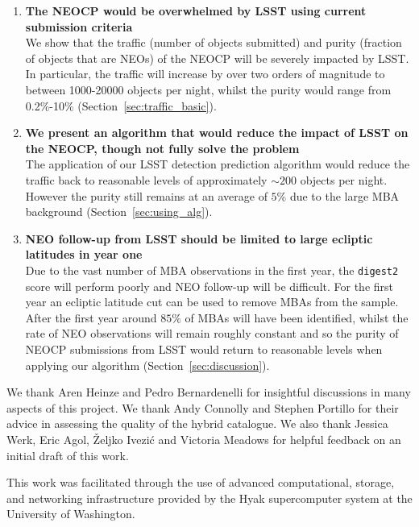 \documentclass[twocolumn]{aastex631}
\newcommand{\dig}{\texttt{digest2}}
\newcommand{\npernightAlg}{200}
\newcommand{\purityAlg}{5}
\begin{document}
\begin{enumerate}
    \item \textbf{The NEOCP would be overwhelmed by LSST using current submission criteria}\\We show that the traffic (number of objects submitted) and purity (fraction of objects that are NEOs) of the NEOCP will be severely impacted by LSST. In particular, the traffic will increase by over two orders of magnitude to between 1000-20000 objects per night, whilst the purity would range from 0.2\%-10\% (Section~\ref{sec:traffic_basic}).
    \item \textbf{We present an algorithm that would reduce the impact of LSST on the NEOCP, though not fully solve the problem}\\The application of our LSST detection prediction algorithm would reduce the traffic back to reasonable levels of approximately ${\sim}\npernightAlg{}$ objects per night. However the purity still remains at an average of $\purityAlg{}\%$ due to the large MBA background (Section~\ref{sec:using_alg}).
    \item \textbf{NEO follow-up from LSST should be limited to large ecliptic latitudes in year one}\\Due to the vast number of MBA observations in the first year, the \dig{} score will perform poorly and NEO follow-up will be difficult. For the first year an ecliptic latitude cut can be used to remove MBAs from the sample. After the first year around $85\%$ of MBAs will have been identified, whilst the rate of NEO observations will remain roughly constant and so the purity of NEOCP submissions from LSST would return to reasonable levels when applying our algorithm (Section~\ref{sec:discussion}).
\end{enumerate}

\begin{acknowledgements}
    We thank Aren Heinze and Pedro Bernardenelli for insightful discussions in many aspects of this project. We thank Andy Connolly and Stephen Portillo for their advice in assessing the quality of the hybrid catalogue. We also thank Jessica Werk, Eric Agol, Željko Ivezić and Victoria Meadows for helpful feedback on an initial draft of this work.
    
    This work was facilitated through the use of advanced computational, storage, and networking infrastructure provided by the Hyak supercomputer system at the University of Washington.
\end{acknowledgements}
\end{document}
